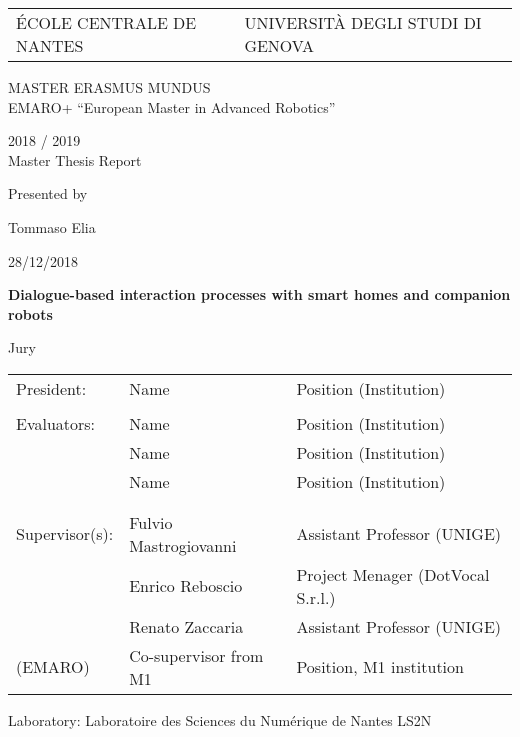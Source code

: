 \thispagestyle{empty}

\def\lskip{\vspace{0.5cm}}


\begin{tabular}{p{7cm}p{8cm}}
ÉCOLE CENTRALE DE NANTES
&
\raggedleft UNIVERSITÀ DEGLI STUDI DI GENOVA	%
\end{tabular}

\vspace{2cm}

\begin{center} \large\sc MASTER ERASMUS MUNDUS \\ \normalsize{EMARO+ ``European Master in Advanced Robotics''} \end{center}


\begin{center}
	2018 / 2019\\
	\lskip
	Master Thesis Report
	\lskip
	
	Presented by \lskip 
	
	Tommaso Elia \lskip
	
	28/12/2018 \lskip\lskip
	
	{\Large \textbf{Dialogue-based interaction processes with smart homes and companion robots}}
	
	\vfill

Jury \lskip
		
	\end{center}
	


\begin{tabular}{p{3cm}p{6cm}p{6cm} }
 President: & Name & Position (Institution) \\ & & \\ 
 Evaluators: & Name & Position (Institution) \\
	      & Name & Position (Institution) \\ 
	      & Name & Position (Institution) \\ & & \\  & & \\ 
  Supervisor(s):  & Fulvio Mastrogiovanni & Assistant Professor (UNIGE)\\
		  & Enrico Reboscio & Project Menager (DotVocal S.r.l.) \\
		  & Renato Zaccaria & Assistant Professor (UNIGE) \\
(EMARO)  & Co-supervisor from M1 & Position, M1 institution 
\end{tabular}

\lskip

\begin{flushleft}
 Laboratory: Laboratoire des Sciences du Numérique de Nantes LS2N
\end{flushleft}

\newpage
\thispagestyle{empty}
\null
\newpage
\addtocounter{page}{-1}
\pagestyle{fancy}
